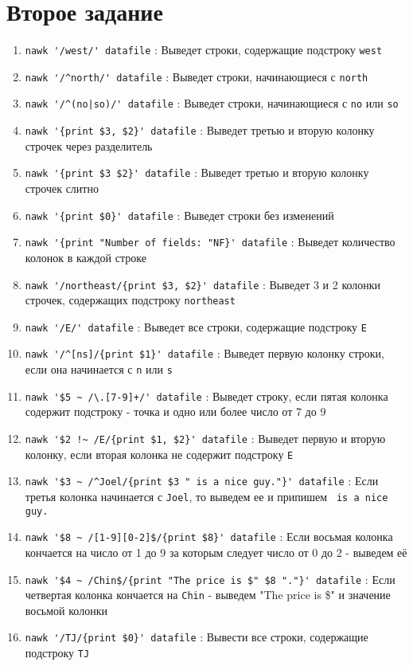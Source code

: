 \documentclass[12pt, a4paper]{article}
\begin{document}
\section*{Второе задание}
\begin{enumerate}
  \item \verb|nawk '/west/' datafile| : Выведет строки, содержащие подстроку
    \verb|west|
  \item \verb|nawk '/^north/' datafile| : Выведет строки, начинающиеся с
    \verb|north|
  \item \verb=nawk '/^(no|so)/' datafile= : Выведет строки, начинающиеся с
    \verb|no| или \verb|so|
  \item \verb|nawk '{print $3, $2}' datafile| : Выведет третью и вторую колонку
    строчек через разделитель
  \item \verb|nawk '{print $3 $2}' datafile| : Выведет третью и вторую колонку
    строчек слитно
  \item \verb|nawk '{print $0}' datafile| : Выведет строки без изменений
  \item \verb|nawk '{print "Number of fields: "NF}' datafile| : Выведет количество
    колонок в каждой строке
  \item \verb|nawk '/northeast/{print $3, $2}' datafile| : Выведет 3 и 2 колонки
    строчек, содержащих подстроку \verb|northeast|
  \item \verb|nawk '/E/' datafile| : Выведет все строки, содержащие подстроку \verb|Е|
  \item \verb|nawk '/^[ns]/{print $1}' datafile| : Выведет первую колонку строки,
    если она начинается с \verb|n| или \verb|s|
  \item \verb|nawk '$5 ~ /\.[7-9]+/' datafile| : Выведет строку, если пятая
    колонка содержит подстроку - точка и одно или более число от 7 до 9
  \item \verb|nawk '$2 !~ /E/{print $1, $2}' datafile| : Выведет первую и вторую
    колонку, если вторая колонка не содержит подстроку \verb|E|
  \item \verb|nawk '$3 ~ /^Joel/{print $3 " is a nice guy."}' datafile| :
    Если третья колонка начинается с \verb|Joel|, то выведем ее и припишем
    \verb| is a nice guy.|
  \item \verb|nawk '$8 ~ /[1-9][0-2]$/{print $8}' datafile| : Если восьмая колонка
    кончается на число от 1 до 9 за которым следует число от 0 до 2 - выведем её
  \item \verb|nawk '$4 ~ /Chin$/{print "The price is $" $8 "."}' datafile| :
    Если четвертая колонка кончается на \verb|Chin| - выведем "The price is \$"
    и значение восьмой колонки
  \item \verb|nawk '/TJ/{print $0}' datafile| : Вывести все строки, содержащие
    подстроку \verb|TJ|
\end{enumerate}
\end{document}
